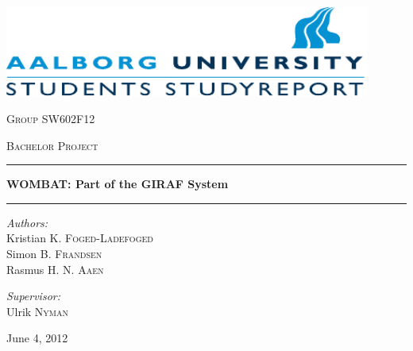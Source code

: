 \begin{titlepage}

\begin{center}

\vspace{1cm}
\includegraphics[width=0.9\textwidth]{Images/aau_logo_en.pdf}\\[1cm]  
\vspace{1.5cm}  

\textsc{\LARGE Group SW602F12}\\[1.5cm]
\vspace{0.5cm}

\textsc{\Large Bachelor Project}\\[0.5cm]


\hrule
\vspace{0.4cm}

{ \huge \bfseries WOMBAT: Part of the GIRAF System}\\[0.4cm]

\hrule
\vspace{3cm}

\begin{minipage}{0.55\textwidth}
\begin{flushleft} \large
\vspace{1.25cm}
\textit{Authors:}\\
Kristian K. \textsc{Foged-Ladefoged}\\

Simon B. \textsc{Frandsen}\\

Rasmus H. N. \textsc{Aaen}
\end{flushleft}
\end{minipage}
\begin{minipage}{0.35\textwidth}
\begin{flushright} \large
\textit{Supervisor:} \\
Ulrik \textsc{Nyman}
\end{flushright}
\end{minipage}

\vfill

{\large June 4, 2012}

\end{center}

\end{titlepage}
